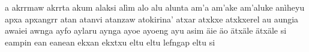 a\hspace{2mm}
akrrmaw\hspace{2mm}
akrrta\hspace{2mm}
akum\hspace{2mm}
alaksi\hspace{2mm}
alìm\hspace{2mm}
alo\hspace{2mm}
alu\hspace{2mm}
alunta\hspace{2mm}
am'a\hspace{2mm}
am'ake\hspace{2mm}
am'aluke\hspace{2mm}
anìheyu\hspace{2mm}
apxa\hspace{2mm}
apxangrr\hspace{2mm}
atan\hspace{2mm}
atanvi\hspace{2mm}
atanzaw\hspace{2mm}
atokirina'\hspace{2mm}
atxar\hspace{2mm}
atxkxe\hspace{2mm}
atxkxerel\hspace{2mm}
au\hspace{2mm}
aungia\hspace{2mm}
awaiei\hspace{2mm}
awnga\hspace{2mm}
ayfo\hspace{2mm}
aylaru\hspace{2mm}
aynga\hspace{2mm}
ayoe\hspace{2mm}
ayoeng\hspace{2mm}
ayu\hspace{2mm}
asim\hspace{2mm}
äie\hspace{2mm}
äo\hspace{2mm}
ätxäle\hspace{2mm}
ätxäle si\hspace{2mm}
eampin\hspace{2mm}
ean\hspace{2mm}
eanean\hspace{2mm}
ekxan\hspace{2mm}
ekxtxu\hspace{2mm}
eltu\hspace{2mm}
eltu lefngap\hspace{2mm}
eltu si\hspace{2mm}
